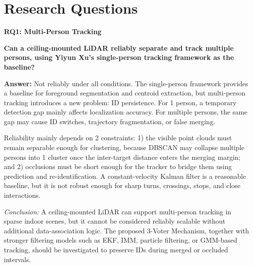 \documentclass[11pt,a4paper]{report}
\newcommand{\boxitemtitle}[1]{
    \vspace{0.5em}
    {\large\textbf{\color{DeepBlue} #1}}\par
    \vspace{0.8em}
}
\begin{document}
\chapter{Research Questions}
\boxitemtitle{RQ1: Multi-Person Tracking}
\begin{contentbox}
\textbf{Can a ceiling-mounted LiDAR reliably separate and track multiple persons, using Yiyun Xu's single-person tracking framework as the baseline?}

\vspace{0.8em}
\textbf{Answer:} Not reliably under all conditions. The single-person framework provides a baseline for foreground segmentation and centroid extraction, but multi-person tracking introduces a new problem: ID persistence. For 1 person, a temporary detection gap mainly affects localization accuracy. For multiple persons, the same gap may cause ID switches, trajectory fragmentation, or false merging.

\vspace{0.6em}
Reliability mainly depends on 2 constraints: 1) the visible point clouds must remain separable enough for clustering, because DBSCAN may collapse multiple persons into 1 cluster once the inter-target distance enters the merging margin; and 2) occlusions must be short enough for the tracker to bridge them using prediction and re-identification. A constant-velocity Kalman filter is a reasonable baseline, but it is not robust enough for sharp turns, crossings, stops, and close interactions.

\vspace{0.6em}
\textit{Conclusion:} A ceiling-mounted LiDAR can support multi-person tracking in sparse indoor scenes, but it cannot be considered reliably scalable without additional data-association logic. The proposed 3-Voter Mechanism, together with stronger filtering models such as EKF, IMM, particle filtering, or GMM-based tracking, should be investigated to preserve IDs during merged or occluded intervals.
\end{contentbox}
\end{document}

